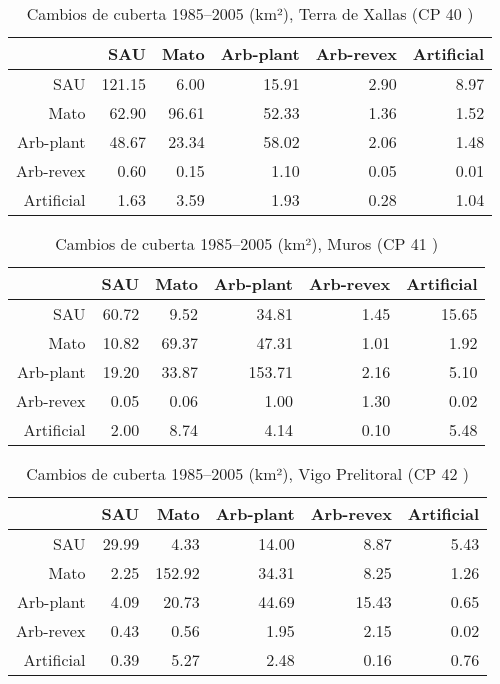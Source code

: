 \begin{table}[p]
\centering
\caption{Cambios de cuberta 1985--2005 (km²), Terra de Xallas (CP 40 )} 
\label{TaboaContinxCP40}
\begin{tabular}{rrrrrr}
  \hline
 & SAU & Mato & Arb-plant & Arb-revex & Artificial \\ 
  \hline
SAU & 121.15 & 6.00 & 15.91 & 2.90 & 8.97 \\ 
  Mato & 62.90 & 96.61 & 52.33 & 1.36 & 1.52 \\ 
  Arb-plant & 48.67 & 23.34 & 58.02 & 2.06 & 1.48 \\ 
  Arb-revex & 0.60 & 0.15 & 1.10 & 0.05 & 0.01 \\ 
  Artificial & 1.63 & 3.59 & 1.93 & 0.28 & 1.04 \\ 
   \hline
\end{tabular}
\end{table}
\clearpage
\begin{table}[p]
\centering
\caption{Cambios de cuberta 1985--2005 (km²), Muros (CP 41 )} 
\label{TaboaContinxCP41}
\begin{tabular}{rrrrrr}
  \hline
 & SAU & Mato & Arb-plant & Arb-revex & Artificial \\ 
  \hline
SAU & 60.72 & 9.52 & 34.81 & 1.45 & 15.65 \\ 
  Mato & 10.82 & 69.37 & 47.31 & 1.01 & 1.92 \\ 
  Arb-plant & 19.20 & 33.87 & 153.71 & 2.16 & 5.10 \\ 
  Arb-revex & 0.05 & 0.06 & 1.00 & 1.30 & 0.02 \\ 
  Artificial & 2.00 & 8.74 & 4.14 & 0.10 & 5.48 \\ 
   \hline
\end{tabular}
\end{table}
\begin{table}[p]
\centering
\caption{Cambios de cuberta 1985--2005 (km²), Vigo Prelitoral (CP 42 )} 
\label{TaboaContinxCP42}
\begin{tabular}{rrrrrr}
  \hline
 & SAU & Mato & Arb-plant & Arb-revex & Artificial \\ 
  \hline
SAU & 29.99 & 4.33 & 14.00 & 8.87 & 5.43 \\ 
  Mato & 2.25 & 152.92 & 34.31 & 8.25 & 1.26 \\ 
  Arb-plant & 4.09 & 20.73 & 44.69 & 15.43 & 0.65 \\ 
  Arb-revex & 0.43 & 0.56 & 1.95 & 2.15 & 0.02 \\ 
  Artificial & 0.39 & 5.27 & 2.48 & 0.16 & 0.76 \\ 
   \hline
\end{tabular}
\end{table}
